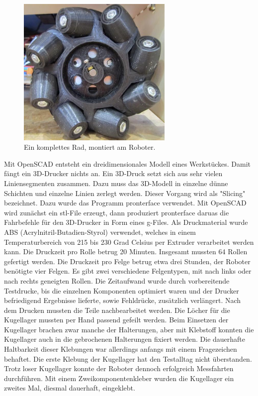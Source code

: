 \documentclass[a4paper,bibtotoc,oneside]{scrbook}
\begin{document}
\begin{figure}[htbp]
\centering
\includegraphics[width=75mm]{img/rad.jpg}
\caption{Ein komplettes Rad, montiert am Roboter.}\label{rad2}
\end{figure}


Mit OpenSCAD entsteht ein dreidimensionales Modell eines Werkstückes. Damit fängt ein 3D-Drucker nichts an. Ein 3D-Druck setzt sich aus sehr vielen Liniensegmenten zusammen. Dazu muss das 3D-Modell in einzelne dünne Schichten und einzelne Linien zerlegt werden. Dieser Vorgang wird als "Slicing" bezeichnet. Dazu wurde das Programm pronterface verwendet. Mit OpenSCAD wird zunächst ein stl-File erzeugt, dann produziert pronterface daruas die Fahrbefehle für den 3D-Drucker in Form eines g-Files. Als Druckmaterial wurde ABS (Acrylnitril-Butadien-Styrol) verwendet, welches in einem Temperaturbereich von 215 bis 230 Grad Celsius per Extruder verarbeitet werden kann.    
Die Druckzeit pro Rolle betrug 20 Minuten. Insgesamt mussten 64 Rollen gefertigt werden. Die Druckzeit pro Felge betrug etwa drei Stunden, der Roboter benötigte vier Felgen. Es gibt zwei verschiedene Felgentypen, mit nach links oder nach rechts geneigten Rollen. 
Die Zeitaufwand wurde durch vorbereitende Testdrucke, bis die einzelnen Komponenten optimiert waren und der Drucker befriedigend Ergebnisse lieferte, sowie Fehldrücke, zusätzlich verlängert. 
Nach dem Drucken mussten die Teile nachbearbeitet werden. Die Löcher für die Kugellager mussten per Hand passend gefeilt werden. Beim  Einsetzen der Kugellager brachen zwar manche der Halterungen, aber mit Klebstoff konnten die Kugellager auch in die gebrochenen Halterungen fixiert werden. Die dauerhafte Haltbarkeit dieser Klebungen war allerdings anfangs mit einem Fragezeichen behaftet. Die erste Klebung der Kugellager hat den Testalltag nicht überstanden. Trotz loser Kugellager konnte der Roboter dennoch erfolgreich Messfahrten durchführen. Mit einem Zweikomponentenkleber wurden die Kugellager ein zweites Mal, diesmal dauerhaft, eingeklebt.
\end{document}

